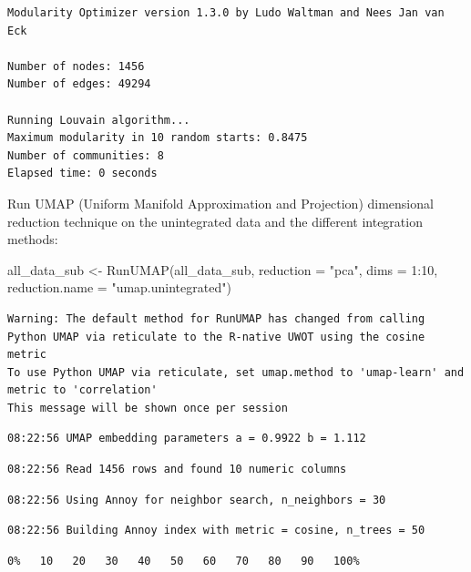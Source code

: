 \documentclass[
  letterpaper,
  DIV=11,
  numbers=noendperiod]{scrreprt}
\newenvironment{Shaded}{\begin{snugshade}}{\end{snugshade}}
\newcommand{\AttributeTok}[1]{\textcolor[rgb]{0.40,0.45,0.13}{#1}}
\newcommand{\DecValTok}[1]{\textcolor[rgb]{0.68,0.00,0.00}{#1}}
\newcommand{\FunctionTok}[1]{\textcolor[rgb]{0.28,0.35,0.67}{#1}}
\newcommand{\NormalTok}[1]{\textcolor[rgb]{0.00,0.23,0.31}{#1}}
\newcommand{\OtherTok}[1]{\textcolor[rgb]{0.00,0.23,0.31}{#1}}
\newcommand{\SpecialCharTok}[1]{\textcolor[rgb]{0.37,0.37,0.37}{#1}}
\newcommand{\StringTok}[1]{\textcolor[rgb]{0.13,0.47,0.30}{#1}}
\begin{document}
\begin{verbatim}
Modularity Optimizer version 1.3.0 by Ludo Waltman and Nees Jan van Eck

Number of nodes: 1456
Number of edges: 49294

Running Louvain algorithm...
Maximum modularity in 10 random starts: 0.8475
Number of communities: 8
Elapsed time: 0 seconds
\end{verbatim}

Run UMAP (Uniform Manifold Approximation and Projection) dimensional
reduction technique on the unintegrated data and the different
integration methods:

\begin{Shaded}
\begin{Highlighting}[]
\NormalTok{all\_data\_sub }\OtherTok{\textless{}{-}} \FunctionTok{RunUMAP}\NormalTok{(all\_data\_sub, }\AttributeTok{reduction =} \StringTok{"pca"}\NormalTok{, }\AttributeTok{dims =} \DecValTok{1}\SpecialCharTok{:}\DecValTok{10}\NormalTok{, }\AttributeTok{reduction.name =} \StringTok{"umap.unintegrated"}\NormalTok{)}
\end{Highlighting}
\end{Shaded}

\begin{verbatim}
Warning: The default method for RunUMAP has changed from calling Python UMAP via reticulate to the R-native UWOT using the cosine metric
To use Python UMAP via reticulate, set umap.method to 'umap-learn' and metric to 'correlation'
This message will be shown once per session
\end{verbatim}

\begin{verbatim}
08:22:56 UMAP embedding parameters a = 0.9922 b = 1.112
\end{verbatim}

\begin{verbatim}
08:22:56 Read 1456 rows and found 10 numeric columns
\end{verbatim}

\begin{verbatim}
08:22:56 Using Annoy for neighbor search, n_neighbors = 30
\end{verbatim}

\begin{verbatim}
08:22:56 Building Annoy index with metric = cosine, n_trees = 50
\end{verbatim}

\begin{verbatim}
0%   10   20   30   40   50   60   70   80   90   100%
\end{verbatim}
\end{document}
